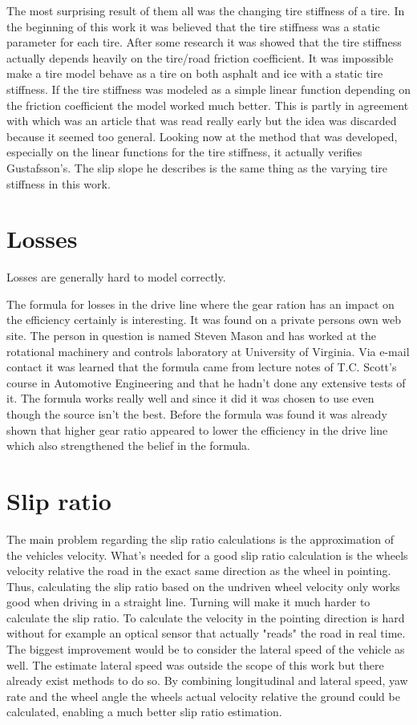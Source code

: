 The most surprising result of them all was the changing tire stiffness of a tire. In the beginning of this work it was believed that the tire stiffness was a static parameter for each tire. After some research it was showed that the tire stiffness actually depends heavily on the tire/road friction coefficient. It was impossible make a tire model behave as a tire on both asphalt and ice with a static tire stiffness. If the tire stiffness was modeled as a simple linear function depending on the friction coefficient the model worked much better. This is partly in agreement with \cite{gustafsson1997} which was an article that was read really early but the idea was discarded because it seemed too general. Looking now at the method that was developed, especially on the linear functions for the tire stiffness, it actually verifies Gustafsson's. The slip slope he describes is the same thing as the varying tire stiffness in this work.


\section{Losses}
Losses are generally hard to model correctly.

The formula for losses in the drive line where the gear ration has an impact on the efficiency certainly is interesting. It was found on a private persons own web site. The person in question is named Steven Mason and has worked at the rotational machinery and controls laboratory at University of Virginia. Via e-mail contact it was learned that the formula came from lecture notes of T.C. Scott's course in Automotive Engineering and that he hadn't done any extensive tests of it. The formula works really well and since it did it was chosen to use even though the source isn't the best. Before the formula was found it was already shown that higher gear ratio appeared to lower the efficiency in the drive line which also strengthened the belief in the formula. 

\section{Slip ratio}
The main problem regarding the slip ratio calculations is the approximation of the vehicles velocity. What's needed for a good slip ratio calculation is the wheels velocity relative the road in the exact same direction as the wheel in pointing. Thus, calculating the slip ratio based on the undriven wheel velocity only works good when driving in a straight line. Turning will make it much harder to calculate the slip ratio. To calculate the velocity in the pointing direction is hard without for example an optical sensor that actually "reads" the road in real time. The biggest improvement would be to consider the lateral speed of the vehicle as well. The estimate lateral speed was outside the scope of this work but there already exist methods to do so. By combining longitudinal and lateral speed, yaw rate and the wheel angle the wheels actual velocity relative the ground could be calculated, enabling a much better slip ratio estimation.


